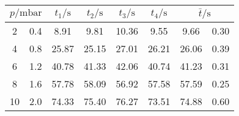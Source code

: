 \label{tab:tabDL1}
	\begin{tabular}{S[table-format=2.0] @{${}\pm{}$} S[table-format=1.1]S[table-format=2.2]S[table-format=2.2]S[table-format=2.2]S[table-format=2.2]S[table-format=2.2] @{${}\pm{}$} S[table-format=1.2]}
		\toprule
		 & {$t_1/\si{\second}$} & {$t_2/\si{\second}$} & {$t_3/\si{\second}$} & {$t_4/\si{\second}$} &  \\
		 & 0.4 & 8.91 & 9.81 & 10.36 & 9.55 & 9.66 & 0.30 \\
		 4 & 0.8 & 25.87 & 25.15 & 27.01 & 26.21 & 26.06 & 0.39 \\
		 6 & 1.2 & 40.78 & 41.33 & 42.06 & 40.74 & 41.23 & 0.31 \\
		 8 & 1.6 & 57.78 & 58.09 & 56.92 & 57.58 & 57.59 & 0.25 \\
		10 & 2.0 & 74.33 & 75.40 & 76.27 & 73.51 & 74.88 & 0.60 \\
		\bottomrule
	\end{tabular}
